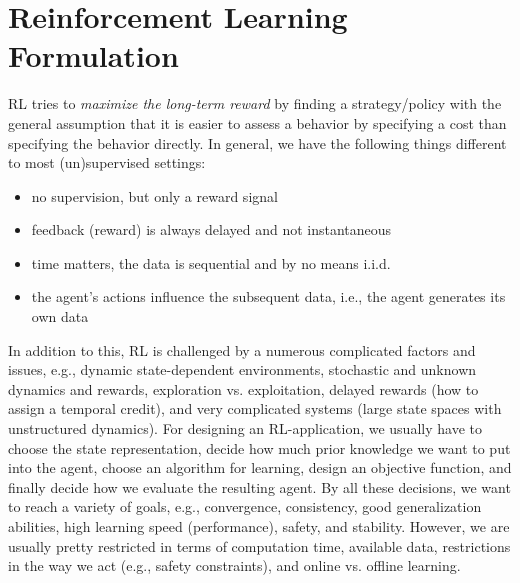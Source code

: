 	\section{Reinforcement Learning Formulation}
		\ac{RL} tries to \emph{maximize the long-term reward} by finding a strategy/policy with the general assumption that it is easier to assess a behavior by specifying a cost than specifying the behavior directly. In general, we have the following things different to most (un)supervised settings:
		\begin{itemize}
			\item no supervision, but only a reward signal
			\item feedback (reward) is always delayed and not instantaneous
			\item time matters, the data is sequential and by no means i.i.d.
			\item the agent's actions influence the subsequent data, i.e., the agent generates its own data
		\end{itemize}
		In addition to this, \ac{RL} is challenged by a numerous complicated factors and issues, e.g., dynamic state-dependent environments, stochastic and unknown dynamics and rewards, exploration vs. exploitation, delayed rewards (how to assign a temporal credit), and very complicated systems (large state spaces with unstructured dynamics). For designing an \ac{RL}-application, we usually have to choose the state representation, decide how much prior knowledge we want to put into the agent, choose an algorithm for learning, design an objective function, and finally decide how we evaluate the resulting agent. By all these decisions, we want to reach a variety of goals, e.g., convergence, consistency, good generalization abilities, high learning speed (performance), safety, and stability. However, we are usually pretty restricted in terms of computation time, available data, restrictions in the way we act (e.g., safety constraints), and online vs. offline learning.

